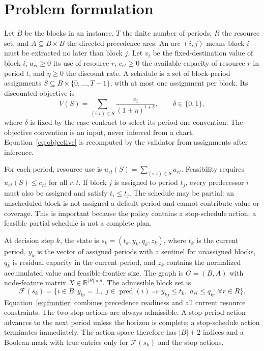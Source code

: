 \documentclass[11pt]{article}
\begin{document}
\section{Problem formulation}
Let $B$ be the blocks in an instance, $T$ the finite number of periods, $R$ the resource set, and $A\subseteq B\times B$ the directed precedence arcs. An arc $(i,j)$ means block $i$ must be extracted no later than block $j$. Let $v_i$ be the fixed-destination value of block $i$, $a_{ri}\geq0$ its use of resource $r$, $c_{rt}\geq0$ the available capacity of resource $r$ in period $t$, and $\eta\geq0$ the discount rate. A schedule is a set of block-period assignments $S\subseteq B\times\{0,\ldots,T-1\}$, with at most one assignment per block. Its discounted objective is
\begin{equation}
V(S)=\sum_{(i,t)\in S}\frac{v_i}{(1+\eta)^{t+\delta}},\qquad \delta\in\{0,1\},
\label{eq:objective}
\end{equation}
where $\delta$ is fixed by the case contract to select its period-one convention. The objective convention is an input, never inferred from a chart. Equation~\ref{eq:objective} is recomputed by the validator from assignments after inference.

For each period, resource use is $u_{rt}(S)=\sum_{(i,t)\in S}a_{ri}$. Feasibility requires $u_{rt}(S)\leq c_{rt}$ for all $r,t$. If block $j$ is assigned to period $t_j$, every predecessor $i$ must also be assigned and satisfy $t_i\leq t_j$. The schedule may be partial: an unscheduled block is not assigned a default period and cannot contribute value or coverage. This is important because the policy contains a stop-schedule action; a feasible partial schedule is not a complete plan.

At decision step $k$, the state is $s_k=(t_k,y_k,q_k,z_k)$, where $t_k$ is the current period, $y_k$ is the vector of assigned periods with a sentinel for unassigned blocks, $q_k$ is residual capacity in the current period, and $z_k$ contains the normalized accumulated value and feasible-frontier size. The graph is $G=(B,A)$ with node-feature matrix $X\in\mathbb R^{|B|\times d}$. The admissible block set is
\begin{equation}
\mathcal F(s_k)=\{i\in B:y_{ki}=\bot,\; j\in\operatorname{pred}(i)\Rightarrow y_{kj}\leq t_k,\; a_{ri}\leq q_{kr}\;\forall r\in R\}.
\label{eq:frontier}
\end{equation}
Equation~\ref{eq:frontier} combines precedence readiness and all current resource constraints. The two stop actions are always admissible. A stop-period action advances to the next period unless the horizon is complete; a stop-schedule action terminates immediately. The action space therefore has $|B|+2$ indices and a Boolean mask with true entries only for $\mathcal F(s_k)$ and the stop actions.
\end{document}
